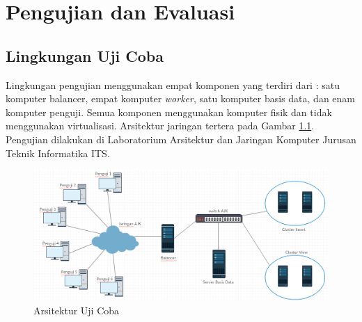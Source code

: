 \documentclass{ta-its}
\begin{document}
	\chapter{Pengujian dan Evaluasi}
		\section{Lingkungan Uji Coba}
			Lingkungan pengujian menggunakan empat komponen yang terdiri dari : satu komputer balancer, empat komputer \textit{worker}, satu komputer basis data, dan enam komputer penguji. Semua komponen menggunakan komputer fisik dan tidak menggunakan virtualisasi. Arsitektur jaringan tertera pada Gambar \ref{gambarArsitekturUjiCoba}. Pengujian dilakukan di Laboratorium Arsitektur dan Jaringan Komputer Jurusan Teknik Informatika ITS. 
			
			\begin{figure}[h] %
				\centering
				\includegraphics[width=\linewidth]{contoh_img/arsitekturujicoba}
				\caption{Arsitektur Uji Coba}
				\label{gambarArsitekturUjiCoba}
			\end{figure}
			
\end{document}
